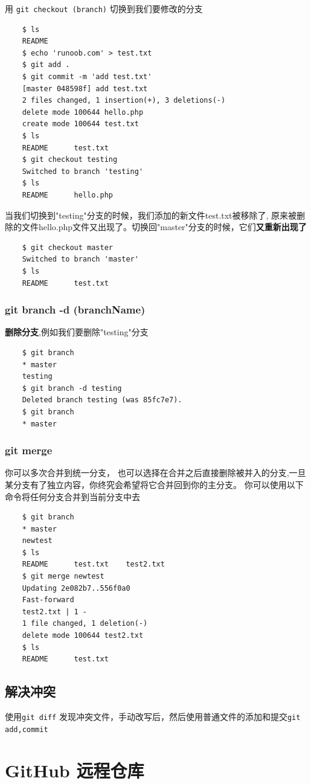 \documentclass[UTF8,a4paper,12pt]{ctexbook}
\begin{document}
			  用 \verb|git checkout (branch)| 切换到我们要修改的分支
			  \begin{lstlisting}
	$ ls
	README
	$ echo 'runoob.com' > test.txt
	$ git add .
	$ git commit -m 'add test.txt'
	[master 048598f] add test.txt
	2 files changed, 1 insertion(+), 3 deletions(-)
	delete mode 100644 hello.php
	create mode 100644 test.txt
	$ ls
	README		test.txt
	$ git checkout testing
	Switched to branch 'testing'
	$ ls
	README		hello.php
			  \end{lstlisting}
			  
			  当我们切换到"testing"分支的时候，我们添加的新文件test.txt被移除了, 原来被删除的文件hello.php文件又出现了。切换回"master"分支的时候，它们\textbf{又重新出现了}
			  \begin{lstlisting}
	$ git checkout master
	Switched to branch 'master'
	$ ls
	README		test.txt
			  \end{lstlisting}
		  \subsection{git branch -d (branchName)}
			 \textbf{删除分支},例如我们要删除"testing"分支
			  
			  \begin{lstlisting}
	$ git branch
	* master
	testing
	$ git branch -d testing
	Deleted branch testing (was 85fc7e7).
	$ git branch
	* master
			  \end{lstlisting}
		  \subsection{git merge}
			  你可以多次合并到统一分支， 也可以选择在合并之后直接删除被并入的分支,一旦某分支有了独立内容，你终究会希望将它合并回到你的主分支。 你可以使用以下命令将任何分支合并到当前分支中去
			  
			  \begin{lstlisting}
	$ git branch
	* master
	newtest
	$ ls
	README		test.txt	test2.txt
	$ git merge newtest
	Updating 2e082b7..556f0a0
	Fast-forward
	test2.txt | 1 -
	1 file changed, 1 deletion(-)
	delete mode 100644 test2.txt
	$ ls
	README		test.txt
			  \end{lstlisting}
	  \section{解决冲突}
		  使用\verb|git diff| 发现冲突文件，手动改写后，然后使用普通文件的添加和提交\verb|git add,commit|
  
  \chapter{GitHub 远程仓库}
\end{document}
